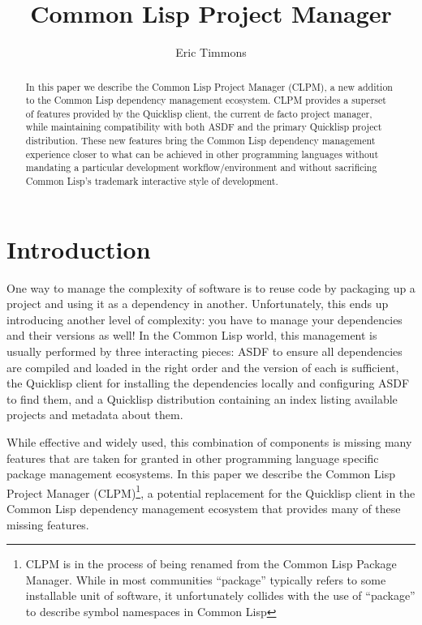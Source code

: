 \documentclass[sigconf]{acmart}
\title{Common Lisp Project Manager}
\author{Eric Timmons}
\begin{document}
\begin{abstract}
  In this paper we describe the Common Lisp Project Manager (CLPM), a new
  addition to the Common Lisp dependency management ecosystem. CLPM provides a
  superset of features provided by the Quicklisp client, the current de facto
  project manager, while maintaining compatibility with both ASDF and the
  primary Quicklisp project distribution. These new features bring the Common
  Lisp dependency management experience closer to what can be achieved in other
  programming languages without mandating a particular development
  workflow/environment and without sacrificing Common Lisp's trademark
  interactive style of development.
\end{abstract}

\maketitle

\section{Introduction}

One way to manage the complexity of software is to reuse code by packaging up a
project and using it as a dependency in another. Unfortunately, this ends up
introducing another level of complexity: you have to manage your dependencies
and their versions as well! In the Common Lisp world, this management is
usually performed by three interacting pieces: ASDF \cite{asdf} to ensure all
dependencies are compiled and loaded in the right order and the version of each
is sufficient, the Quicklisp client \cite{ql} for installing the dependencies
locally and configuring ASDF to find them, and a Quicklisp distribution
containing an index listing available projects and metadata about them.

While effective and widely used, this combination of components is missing many
features that are taken for granted in other programming language specific
package management ecosystems. In this paper we describe the Common Lisp
Project Manager (CLPM)\footnote{CLPM is in the process of being renamed from
  the Common Lisp Package Manager. While in most communities ``package''
  typically refers to some installable unit of software, it unfortunately
  collides with the use of ``package'' to describe symbol namespaces in Common
  Lisp}, a potential replacement for the Quicklisp client in the Common Lisp
dependency management ecosystem that provides many of these missing features.
\end{document}
